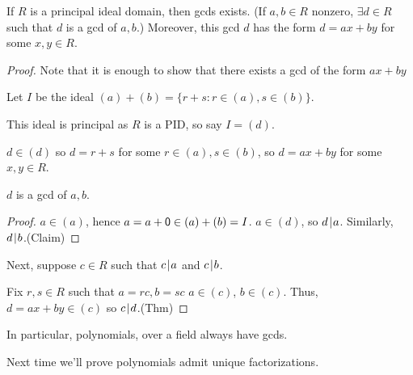 \documentclass[notes.tex]{subfiles}
\begin{document}
\begin{theorem}
	If $R$ is a principal ideal domain, then gcds exists. (If $a,b\in R$ nonzero, $\exists d\in R$ such that $d$ is a gcd of $a, b$.) Moreover, this gcd $d$ has the form $d=ax+by$ for some $x, y\in R$.
\end{theorem}
\begin{proof}
	Note that it is enough to show that there exists a gcd of the form $ax+by$

	Let $I$ be the ideal $(a) + (b) = \{r + s : r\in (a), s\in (b)\}$.

	This ideal is principal as $R$ is a PID, so say $I = (d)$.

	$d\in (d)$ so $d = r + s$ for some $r\in (a), s\in (b)$, so $d = ax+by$ for some $x,y\in R$. 

	\begin{claim}
		$d$ is a gcd of $a, b$.
	\end{claim}
	\begin{proof}
		$a\in (a)$, hence $a = a + \mathsf{0}\in (a) + (b) = I$.
		$a\in (d)$, so $d\mkern2mu|\mkern1mu a$.
		Similarly, $d\mkern2mu|\mkern1mu b$.\qedhere(Claim)
	\end{proof}

	Next, suppose $c\in R$ such that $c\mkern2mu|\mkern1mu a$ and $c\mkern2mu|\mkern1mu b$.


	Fix $r,s\in R$ such that $a=rc, b=sc$ $a\in (c)$, $b\in (c)$. Thus, $d = ax + by \in (c)$ so $c\mkern2mu|\mkern1mu d$.\qedhere(Thm)
\end{proof}

In particular, polynomials, over a field always have gcds.

Next time we'll prove polynomials admit unique factorizations.
\end{document}
